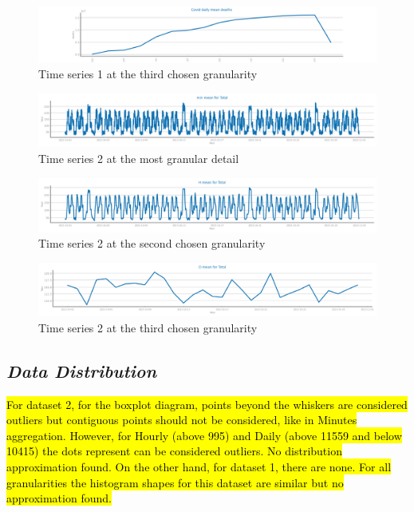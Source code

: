 \documentclass[10pt]{extarticle}
\newcommand{\ctext}[3][RGB]{%
  \begingroup
  \definecolor{hlcolor}{#1}{#2}\sethlcolor{hlcolor}%
  \hl{#3}%
  \endgroup
}
\begin{document}
\begin{figure}[H]
\centering\includegraphics[scale=0.5]{images/dataset1/time_series/Covid_granularity_aggregation_Q.png}
\caption{Time series 1 at the third chosen granularity}
\end{figure}

\begin{figure}[H]
\centering\includegraphics[scale=0.5]{images/dataset2/time_series/fts_granularity_min.png}
\caption{Time series 2 at the most granular detail}
\end{figure}

\begin{figure}[H]
\centering\includegraphics[scale=0.5]{images/dataset2/time_series/fts_granularity_H.png}
\caption{Time series 2 at the second chosen granularity}
\end{figure}

\begin{figure}[H]
\centering\includegraphics[scale=0.5]{images/dataset2/time_series/fts_granularity_D.png}
\caption{Time series 2 at the third chosen granularity}
\end{figure}

\subsection*{\textit{Data Distribution}}
\ctext[RGB]{190,190,190}{For dataset 2, for the boxplot diagram, points beyond the whiskers are considered outliers but contiguous points should not be considered, like in Minutes aggregation. However, for Hourly (above 995) and Daily (above 11559 and below 10415) the dots represent can be considered outliers. No distribution approximation found.
On the other hand, for dataset 1, there are none. For all granularities the histogram shapes for this dataset are similar but no approximation found. }
\end{document}
